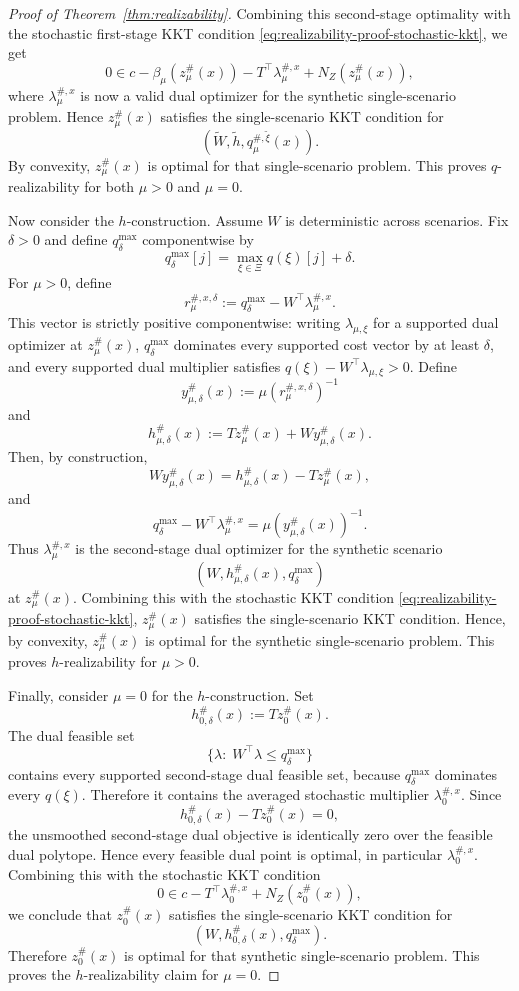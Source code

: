 \documentclass{article}
\newcommand{\1}{\mathbf{1}}
\theoremstyle{plain}
\theoremstyle{definition}
\theoremstyle{remark}
\begin{document}
\begin{proof}[Proof of Theorem~\ref{thm:realizability}]
Combining this second-stage optimality with the stochastic first-stage KKT condition \eqref{eq:realizability-proof-stochastic-kkt}, we get
\[
0\in c-\beta_\mu(z_\mu^\#(x))-T^\top\lambda_\mu^{\#,x}+N_Z(z_\mu^\#(x)),
\]
where $\lambda_\mu^{\#,x}$ is now a valid dual optimizer for the synthetic single-scenario problem. Hence $z_\mu^\#(x)$ satisfies the single-scenario KKT condition for
\[
(\widetilde W,\widetilde h,q_\mu^{\#,\tilde\xi}(x)).
\]
By convexity, $z_\mu^\#(x)$ is optimal for that single-scenario problem. This proves $q$-realizability for both $\mu>0$ and $\mu=0$.

Now consider the $h$-construction. Assume $W$ is deterministic across scenarios. Fix $\delta>0$ and define $q_\delta^{\max}$ componentwise by
\[
q_\delta^{\max}[j]
=
\max_{\xi\in\Xi}q(\xi)[j]+\delta.
\]
For $\mu>0$, define
\[
r_\mu^{\#,x,\delta}
:=
q_\delta^{\max}-W^\top\lambda_\mu^{\#,x}.
\]
This vector is strictly positive componentwise: writing $\lambda_{\mu,\xi}$ for a supported dual optimizer at $z_\mu^\#(x)$, $q_\delta^{\max}$ dominates every supported cost vector by at least $\delta$, and every supported dual multiplier satisfies $q(\xi)-W^\top\lambda_{\mu,\xi}>0$. Define
\[
y_{\mu,\delta}^\#(x)
:=
\mu\left(r_\mu^{\#,x,\delta}\right)^{-1}
\]
and
\[
h_{\mu,\delta}^\#(x)
:=
Tz_\mu^\#(x)+Wy_{\mu,\delta}^\#(x).
\]
Then, by construction,
\[
Wy_{\mu,\delta}^\#(x)
=
h_{\mu,\delta}^\#(x)-Tz_\mu^\#(x),
\]
and
\[
q_\delta^{\max}-W^\top\lambda_\mu^{\#,x}
=
\mu\left(y_{\mu,\delta}^\#(x)\right)^{-1}.
\]
Thus $\lambda_\mu^{\#,x}$ is the second-stage dual optimizer for the synthetic scenario
\[
(W,h_{\mu,\delta}^\#(x),q_\delta^{\max})
\]
at $z_\mu^\#(x)$. Combining this with the stochastic KKT condition \eqref{eq:realizability-proof-stochastic-kkt}, $z_\mu^\#(x)$ satisfies the single-scenario KKT condition. Hence, by convexity, $z_\mu^\#(x)$ is optimal for the synthetic single-scenario problem. This proves $h$-realizability for $\mu>0$.

Finally, consider $\mu=0$ for the $h$-construction. Set
\[
h_{0,\delta}^\#(x)
:=
Tz_0^\#(x).
\]
The dual feasible set
\[
\{\lambda:\;W^\top\lambda\leq q_\delta^{\max}\}
\]
contains every supported second-stage dual feasible set, because $q_\delta^{\max}$ dominates every $q(\xi)$. Therefore it contains the averaged stochastic multiplier $\lambda_0^{\#,x}$. Since
\[
h_{0,\delta}^\#(x)-Tz_0^\#(x)=0,
\]
the unsmoothed second-stage dual objective is identically zero over the feasible dual polytope. Hence every feasible dual point is optimal, in particular $\lambda_0^{\#,x}$. Combining this with the stochastic KKT condition
\[
0\in c-T^\top\lambda_0^{\#,x}+N_Z(z_0^\#(x)),
\]
we conclude that $z_0^\#(x)$ satisfies the single-scenario KKT condition for
\[
(W,h_{0,\delta}^\#(x),q_\delta^{\max}).
\]
Therefore $z_0^\#(x)$ is optimal for that synthetic single-scenario problem. This proves the $h$-realizability claim for $\mu=0$.
\end{proof}
\end{document}
